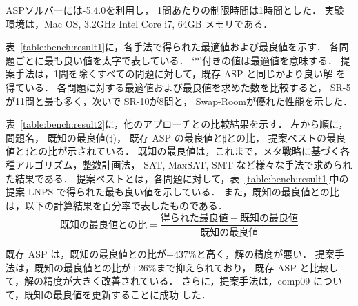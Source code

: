 ASPソルバーには{\clingo}-5.4.0を利用し，
1問あたりの制限時間は1時間とした．
実験環境は，Mac OS, 3.2GHz Intel Core i7, 64GB メモリである．

表~\ref{table:bench:result1}に，各手法で得られた最適値および最良値を示す．
各問題ごとに最も良い値を太字で表している．
`$\ast$'付きの値は最適値を意味する．
提案手法は，1問を除くすべての問題に対して，既存 ASP と同じかより良い解
を得ている．
各問題に対する最適値および最良値を求めた数を比較すると，
\textsf{SR-5}が11問と最も多く，次いで
\textsf{SR-10}が8問と，
\textsf{Swap-Room}が優れた性能を示した．


表~\ref{table:bench:result2}に，他のアプローチとの比較結果を示す．
左から順に，
問題名，
既知の最良値($\sharp$)，
既存 ASP の最良値と$\sharp$との比，
提案ベストの最良値と$\sharp$との比が示されている．
既知の最良値は，これまで，メタ戦略に基づく各種アルゴリズム，整数計画法，
SAT, MaxSAT, SMT など様々な手法で求められた結果である．
提案ベストとは，各問題に対して，表~\ref{table:bench:result1}中の提案
LNPS で得られた最も良い値を示している．
また，既知の最良値との比は，以下の計算結果を百分率で表したものである．
\[
既知の最良値との比 = \frac{得られた最良値 - 既知の最良値}{既知の最良値}
\]

既存 ASP は，既知の最良値との比が$+437\%$と高く，解の精度が悪い．
提案手法は，既知の最良値との比が$+26\%$まで抑えられており，
既存 ASP と比較して，解の精度が大きく改善されている．
さらに，提案手法は，comp09 について，既知の最良値を更新することに成功
した．

